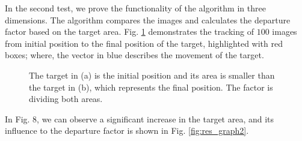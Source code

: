 In the second test, we prove the functionality of the algorithm in three dimensions. 
The algorithm compares the images and calculates the departure factor 
based on the target area. Fig. \ref{fig:target} demonstrates the 
tracking of $100$ images from initial position to the final position of the target, 
highlighted with red boxes;
where, the vector in blue describes the movement of the target. 
\begin{figure}[!hbt]
\centering
  \caption{The target in (a) is the initial position and its area is smaller than the target in (b), 
  which represents the final position. The factor is dividing both areas.}
  \label{fig:target}
\end{figure}
In Fig. 8, we can observe a significant increase in the target area, and 
its influence to the departure factor is shown in Fig. \ref{fig:res_graph2}.

